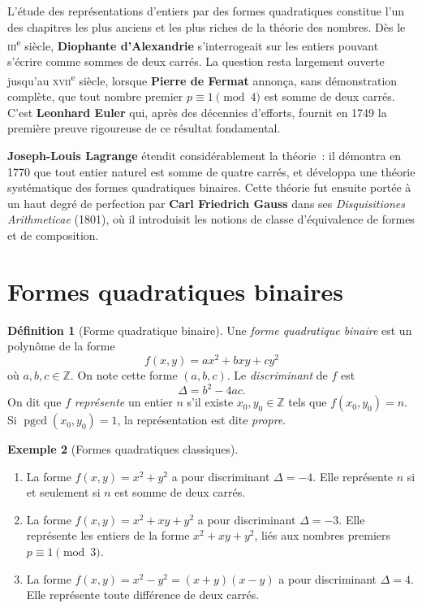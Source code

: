 \documentclass[12pt,a4paper,openany]{book}
\theoremstyle{definition}
\newtheorem{definition}{Définition}[chapter]
\newtheorem{exemple}[definition]{Exemple}
\theoremstyle{plain}
\theoremstyle{remark}
\newcommand{\Z}{\mathbb{Z}}
\DeclareMathOperator{\pgcd}{pgcd}
\begin{document}
L'étude des représentations d'entiers par des formes quadratiques constitue l'un des
chapitres les plus anciens et les plus riches de la théorie des nombres. Dès le
\textsc{iii}\textsuperscript{e} siècle, \textbf{Diophante d'Alexandrie}
s'interrogeait sur les entiers pouvant s'écrire comme sommes de deux carrés. La question
resta largement ouverte jusqu'au \textsc{xvii}\textsuperscript{e} siècle, lorsque
\textbf{Pierre de Fermat} annonça, sans démonstration complète, que tout
nombre premier $p \equiv 1 \pmod{4}$ est somme de deux carrés. C'est
\textbf{Leonhard Euler} qui, après des décennies d'efforts, fournit en 1749
la première preuve rigoureuse de ce résultat fondamental.

\textbf{Joseph-Louis Lagrange} étendit considérablement la théorie~: il
démontra en 1770 que tout entier naturel est somme de quatre carrés, et développa une
théorie systématique des formes quadratiques binaires. Cette théorie fut ensuite portée à
un haut degré de perfection par \textbf{Carl Friedrich Gauss} dans ses
\emph{Disquisitiones Arithmeticae} (1801), où il introduisit les notions de classe
d'équivalence de formes et de composition.

\section{Formes quadratiques binaires}
\label{sec:formes-binaires}

\begin{definition}[Forme quadratique binaire]
\label{def:forme-quadratique-binaire}
Une \emph{forme quadratique binaire} est un polynôme de la forme
\[
  f(x,y) = ax^2 + bxy + cy^2
\]
où $a, b, c \in \Z$. On note cette forme $(a,b,c)$. Le \emph{discriminant} de $f$ est
\[
  \Delta = b^2 - 4ac.
\]
On dit que $f$ \emph{représente} un entier $n$ s'il existe $x_0, y_0 \in \Z$ tels que
$f(x_0, y_0) = n$. Si $\pgcd(x_0, y_0) = 1$, la représentation est dite
\emph{propre}.
\end{definition}

\begin{exemple}[Formes quadratiques classiques]
\label{ex:formes-classiques}
\begin{enumerate}[label=(\alph*)]
  \item La forme $f(x,y) = x^2 + y^2$ a pour discriminant $\Delta = -4$. Elle représente
    $n$ si et seulement si $n$ est somme de deux carrés.
  \item La forme $f(x,y) = x^2 + xy + y^2$ a pour discriminant $\Delta = -3$. Elle
    représente les entiers de la forme $x^2 + xy + y^2$, liés aux nombres premiers
    $p \equiv 1 \pmod{3}$.
  \item La forme $f(x,y) = x^2 - y^2 = (x+y)(x-y)$ a pour discriminant $\Delta = 4$.
    Elle représente toute différence de deux carrés.
\end{enumerate}
\end{exemple}
\end{document}
